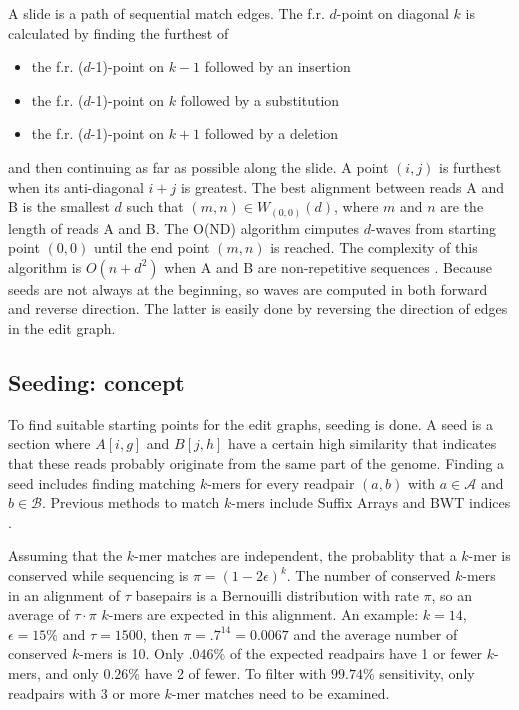 \documentclass[../main/thesis.tex]{subfiles}
\begin{document}
A slide is a path of sequential match edges.
The f.r. $d$-point on diagonal $k$ is calculated by finding the furthest of
\begin{itemize}
\item the f.r. ($d$-1)-point on $k-1$ followed by an insertion
\item the f.r. ($d$-1)-point on $k$ followed by a substitution
\item the f.r. ($d$-1)-point on $k+1$ followed by a deletion
\end{itemize}
and then continuing as far as possible along the slide.
A point $(i,j)$ is furthest when its anti-diagonal $i+j$ is greatest.
The best alignment between reads A and B is the smallest $d$ such that $(m,n)\in W_{(0,0)}(d)$, where $m$ and $n$ are the length of reads A and B.
The O(ND) algorithm cimputes $d$-waves from starting point $(0,0)$ until the end point $(m,n)$ is reached.
The complexity of this algorithm is $O(n+d^2)$ when A and B are non-repetitive sequences \cite{Daligner}.
Because seeds are not always at the beginning, so waves are computed in both forward and reverse direction.
The latter is easily done by reversing the direction of edges in the edit graph.

\subsection{Seeding: concept}
To find suitable starting points for the edit graphs, seeding is done.
A seed is a section where $A[i,g]$ and $B[j,h]$ have a certain high similarity that indicates that these reads probably originate from the same part of the genome.
Finding a seed includes finding matching $k$-mers for every readpair $(a,b)$ with $a\in \mathcal{A}$ and $b\in \mathcal{B}$.
Previous methods to match $k$-mers include Suffix Arrays \cite{SA} and BWT indices \cite{BWT}.

Assuming that the $k$-mer matches are independent, the probablity that a $k$-mer is conserved while sequencing is $\pi = (1-2\epsilon)^k$.
The number of conserved $k$-mers in an alignment of $\tau$ basepairs is a Bernouilli distribution with rate $\pi$, so an average of $\tau\cdot\pi$ $k$-mers are expected in this alignment.
An example: $k=14$, $\epsilon=15\%$ and $\tau = 1500$, then $\pi = .7^{14} = 0.0067$ and the average number of conserved $k$-mers is 10.
Only $.046\%$ of the expected readpairs have 1 or fewer $k$-mers, and only $0.26\%$ have 2 of fewer.
To filter with $99.74\%$ sensitivity, only readpairs with 3 or more $k$-mer matches need to be examined.
\end{document}
